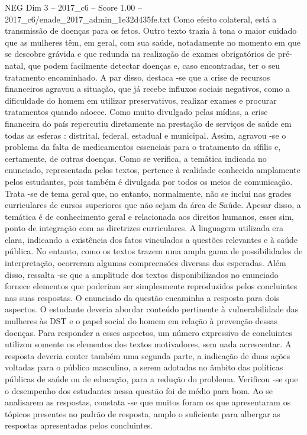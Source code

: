 \begin{textsample}{NEG Dim 3 – 2017\_c6 – Score 1.00 – 2017\_c6/enade\_2017\_admin\_1e32d435fe.txt}
Como efeito colateral, está a transmissão de doenças para os fetos.
Outro texto trazia à tona o maior cuidado que as mulheres têm, em geral, com sua saúde, notadamente no momento em que se descobre grávida e que redunda na realização de exames obrigatórios de pré-natal, que podem facilmente detectar doenças e, caso encontradas, ter o seu tratamento encaminhado.
A par disso, destaca -se que a crise de recursos financeiros agravou a situação, que já recebe influxos sociais negativos, como a dificuldade do homem em utilizar preservativos, realizar exames e procurar tratamentos quando adoece.
Como muito divulgado pelas mídias, a crise financeira do país repercutiu diretamente na prestação de serviços de saúde em todas as esferas : distrital, federal, estadual e municipal.
Assim, agravou -se o problema da falta de medicamentos essenciais para o tratamento da sífilis e, certamente, de outras doenças.
Como se verifica, a temática indicada no enunciado, representada pelos textos, pertence à realidade conhecida amplamente pelos estudantes, pois também é divulgada por todos os meios de comunicação.
Trata -se de tema geral que, no entanto, normalmente, não se inclui nas grades curriculares de cursos superiores que não sejam da área de Saúde.
Apesar disso, a temática é de conhecimento geral e relacionada aos direitos humanos, esses sim, ponto de integração com as diretrizes curriculares.
A linguagem utilizada era clara, indicando a existência dos fatos vinculados a questões relevantes e à saúde pública.
No entanto, como os textos trazem uma ampla gama de possibilidades de interpretação, ocorreram algumas compreensões diversas das esperadas.
Além disso, ressalta -se que a amplitude dos textos disponibilizados no enunciado fornece elementos que poderiam ser simplesmente reproduzidos pelos concluintes nas suas respostas.
O enunciado da questão encaminha a resposta para dois aspectos.
O estudante deveria abordar conteúdo pertinente à vulnerabilidade das mulheres às DST e o papel social do homem em relação à prevenção dessas doenças.
Para responder a esses aspectos, um número expressivo de concluintes utilizou somente os elementos dos textos motivadores, sem nada acrescentar.
A resposta deveria conter também uma segunda parte, a indicação de duas ações voltadas para o público masculino, a serem adotadas no âmbito das políticas públicas de saúde ou de educação, para a redução do problema.
Verificou -se que o desempenho dos estudantes nessa questão foi de médio para bom.
Ao se analisarem as respostas, constata -se que muitos foram os que apresentaram os tópicos presentes no padrão de resposta, amplo o suficiente para albergar as respostas apresentadas pelos concluintes.

\end{textsample}
